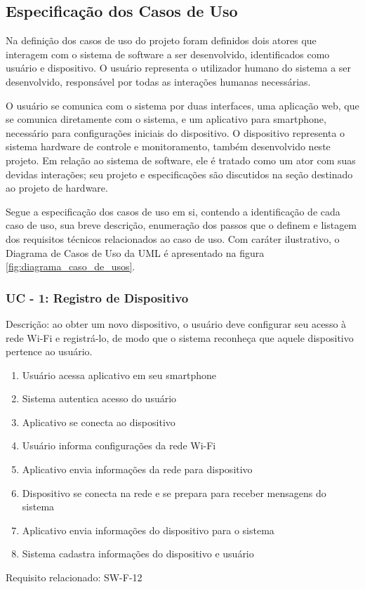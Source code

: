 \subsection{Especificação dos Casos de Uso}

Na definição dos casos de uso do projeto foram definidos dois atores que interagem com o sistema de software a ser desenvolvido, identificados como 
usuário e dispositivo. O usuário representa o utilizador humano do sistema a ser desenvolvido, responsável por todas as interações humanas necessárias. 

O usuário se comunica com o sistema por duas interfaces, uma aplicação web, que se comunica diretamente com o sistema, e um aplicativo para smartphone, necessário para configurações iniciais do dispositivo. O dispositivo representa o sistema hardware de controle e monitoramento, também desenvolvido neste projeto. Em relação ao sistema de software, ele é tratado como um ator com suas devidas interações; seu projeto e especificações são discutidos na seção destinado ao projeto de hardware.

Segue a especificação dos casos de uso em si, contendo a identificação de cada caso de uso, sua breve descrição, enumeração dos passos que o definem e 
listagem dos requisitos técnicos relacionados ao caso de uso. Com caráter ilustrativo, o Diagrama de Casos de Uso da UML é apresentado na figura \ref{fig:diagrama_caso_de_usos}.

\subsubsection*{UC - 1: Registro de Dispositivo} 

Descrição: ao obter um novo dispositivo, o usuário deve configurar seu acesso à rede Wi-Fi e registrá-lo, de modo que o sistema reconheça que aquele 
dispositivo pertence ao usuário.
\begin{enumerate}
    \item Usuário acessa aplicativo em seu smartphone
    \item Sistema autentica acesso do usuário
    \item Aplicativo se conecta ao dispositivo 
    \item Usuário informa configurações da rede Wi-Fi
    \item Aplicativo envia informações da rede para dispositivo
    \item Dispositivo se conecta na rede e se prepara para receber mensagens do sistema
    \item Aplicativo envia informações do dispositivo para o sistema
    \item Sistema cadastra informações do dispositivo e usuário
\end{enumerate}
Requisito relacionado: SW-F-12

